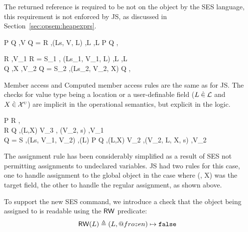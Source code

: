 \documentclass[a4paper,notitlepage]{report}
\begin{document}
  The returned reference is required to be not on the \nil object by the SES
  language, this requirement is not enforced by JS, as discussed in
  Section~\ref{sec:opsem:heapexprs}.

  {\tr P {} {Q \sep \rv \doteq V} \quad Q = R \sep \getValue(Ls, V, L)
    \sep L \not\doteq \nil \sep L\dotin\loc}
  {\tr P {} {Q \sep \rv \doteq {}}}

  {
     {} {R \sep \rv \doteq V_1} \quad R = S_1 \sep
    \getValue(Ls_1, V_1, L) \sep L \not\doteq \nil \sep L\dotin\loc\\
     {} {Q \sep X \dotin \uvars \sep \rv \doteq V_2}
    \quad Q = S_2 \sep \getValue(Ls_2, V_2, X)
  }
  { {} {Q \sep \rv \doteq {}}}

  Member access and Computed member access rules are the same as for JS. The
  checks for value type being a location or a user-definable field
  ($L \mathbin{\dot\in} \mathcal{L}$ and $X \mathbin{\dot\in} \mathcal{X}^{\textsc{u}}$) are implicit in
  the operational semantics, but explicit in the logic.

    {
      \tr P {} {R \sep \rv \doteq {}} \\
      \tr R {} {Q \sep (L,X) \pointsto V_3 \sep
        \bpGen(V_2, s) \sep \rv \doteq V_1} \\
      Q = S \sep \getValue(Ls, V_1, V_2) \sep \ReadWrite(L)
    }
    {\tr P {} {Q \sep (L,X) \pointsto V_2 \sep \bpGen(V_2, L, X,
    s) \sep \rv \doteq V_2}}

    The assignment rule has been considerably simplified as a result of SES not
    permitting assignments to undeclared variables. JS had two rules for this
    case, one to handle assignment to the global object in the case where (\nil,
    X) was the target field, the other to handle the regular assignment, as
    shown above.

    To support the new SES  command, we introduce a check that the
    object being assigned to is readable using the $\mathsf{RW}$ predicate:
    \[  \mathsf{RW}(L) \triangleq (L,@frozen) \mapsto \texttt{false}  \]
\end{document}
